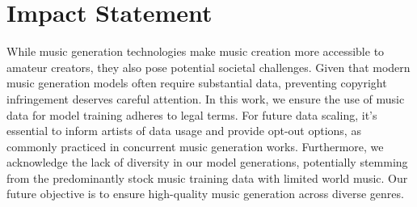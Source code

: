 \section*{Impact Statement}
While music generation technologies make music creation more accessible to amateur creators, they also pose potential societal challenges. Given that modern music generation models often require substantial data, preventing copyright infringement deserves careful attention. In this work, we ensure the use of music data for model training adheres to legal terms. For future data scaling, it's essential to inform artists of data usage and provide opt-out options, as commonly practiced in concurrent music generation works. Furthermore, we acknowledge the lack of diversity in our model generations, potentially stemming from the predominantly stock music training data with limited world music. Our future objective is to ensure high-quality music generation across diverse genres.

